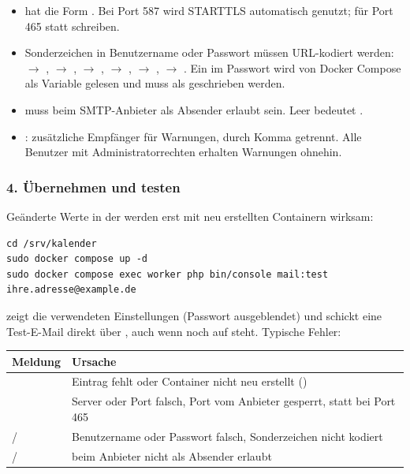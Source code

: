 \begin{itemize}
  \item {} hat die Form
        . Bei Port 587
        wird STARTTLS automatisch genutzt; für Port 465 
        statt  schreiben.
  \item Sonderzeichen in Benutzername oder Passwort müssen URL-kodiert
        werden:  $\rightarrow$ , \code{:} $\rightarrow$
        , \code{/} $\rightarrow$ , \code{\#}
        $\rightarrow$ ,  $\rightarrow$ ,
        \code{\%} $\rightarrow$ . Ein \code{\$} im Passwort
        wird von Docker Compose als Variable gelesen und muss als
        \code{\$\$} geschrieben werden.
  \item {} muss beim SMTP-Anbieter als Absender erlaubt sein.
        Leer bedeutet .
  \item {}: zusätzliche Empfänger für Warnungen,
        durch Komma getrennt. Alle Benutzer mit Administratorrechten
        erhalten Warnungen ohnehin.
\end{itemize}

\subsubsection*{4. Übernehmen und testen}

Geänderte Werte in der  werden erst mit neu erstellten Containern
wirksam:

\begin{lstlisting}
cd /srv/kalender
sudo docker compose up -d
sudo docker compose exec worker php bin/console mail:test ihre.adresse@example.de
\end{lstlisting}

 zeigt die verwendeten Einstellungen (Passwort ausgeblendet)
und schickt eine Test-E-Mail direkt über , auch wenn
 noch auf  steht. Typische Fehler:

\begin{center}
\begin{tabularx}{\textwidth}{L{5.4cm}X}
\toprule
\textbf{Meldung} & \textbf{Ursache} \\
\midrule
{} & Eintrag fehlt oder Container nicht neu
  erstellt () \\
 & Server oder Port falsch,
  Port vom Anbieter gesperrt,  statt  bei
  Port 465 \\
 /  & Benutzername oder Passwort
  falsch, Sonderzeichen nicht kodiert \\
 /  &  beim
  Anbieter nicht als Absender erlaubt \\
\bottomrule
\end{tabularx}
\end{center}


